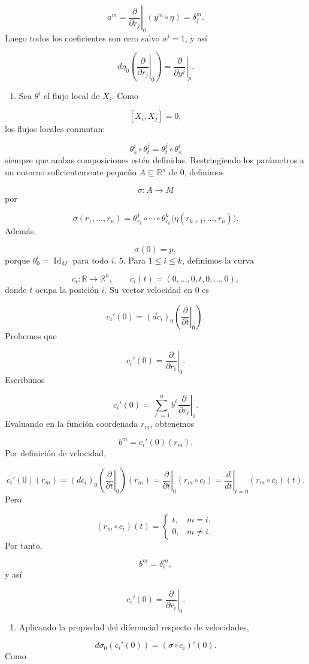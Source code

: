 \begin{bookproof}{}
\[
a^m=\left.\frac{\partial}{\partial r_j}\right|_0(y^m\circ\eta)=\delta_j^m.
\]
Luego todos los coeficientes son cero salvo $a^j=1$, y así

\[
d\eta_0\left(\left.\frac{\partial}{\partial r_j}\right|_0\right)=\left.\frac{\partial}{\partial y^j}\right|_p.
\]
\begin{enumerate}[start=4]
\item Sea $\theta^i$ el flujo local de $X_i$. Como
\end{enumerate}
\[
[X_i,X_j]=0,
\]
los flujos locales conmutan:

\[
\theta_s^i\circ\theta_t^j=\theta_t^j\circ\theta_s^i
\]
siempre que ambas composiciones estén definidas. Restringiendo los parámetros a un entorno suficientemente pequeño $A\subseteq\mathbb R^n$ de $0$, definimos

\[
\sigma:A\longrightarrow M
\]
por

\[
\sigma(r_1,\ldots,r_n)=\theta_{r_1}^1\circ\cdots\circ\theta_{r_k}^k\bigl(\eta(r_{k+1},\ldots,r_n)\bigr).
\]
Además,

\[
\sigma(0)=p,
\]
porque $\theta_0^i=\operatorname{Id}_M$ para todo $i$. 5. Para $1\leq i\leq k$, definimos la curva

\[
c_i:\mathbb R\longrightarrow\mathbb R^n,\qquad c_i(t)=(0,\ldots,0,t,0,\ldots,0),
\]
donde $t$ ocupa la posición $i$. Su vector velocidad en $0$ es

\[
c_i'(0)=(dc_i)_0\left(\left.\frac{\partial}{\partial t}\right|_0\right).
\]
Probemos que

\[
c_i'(0)=\left.\frac{\partial}{\partial r_i}\right|_0.
\]
Escribimos

\[
c_i'(0)=\sum_{\ell=1}^n b^\ell\left.\frac{\partial}{\partial r_\ell}\right|_0.
\]
Evaluando en la función coordenada $r_m$, obtenemos

\[
b^m=c_i'(0)(r_m).
\]
Por definición de velocidad,

\[
c_i'(0)(r_m)=(dc_i)_0\left(\left.\frac{\partial}{\partial t}\right|_0\right)(r_m)=\left.\frac{\partial}{\partial t}\right|_0(r_m\circ c_i)=\left.\frac{d}{dt}\right|_{t=0}(r_m\circ c_i)(t).
\]
Pero

\[
(r_m\circ c_i)(t)=\begin{cases}t,&m=i,\\0,&m\neq i.\end{cases}
\]
Por tanto,

\[
b^m=\delta_i^m,
\]
y así

\[
c_i'(0)=\left.\frac{\partial}{\partial r_i}\right|_0.
\]
\begin{enumerate}[start=6]
\item Aplicando la propiedad del diferencial respecto de velocidades,
\end{enumerate}
\[
d\sigma_0(c_i'(0))=(\sigma\circ c_i)'(0).
\]
Como


\end{bookproof}
